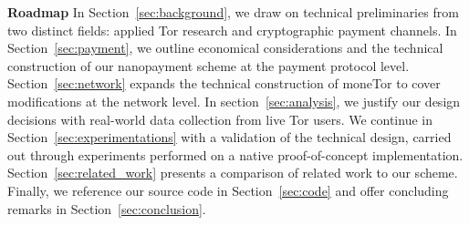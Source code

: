 \textbf{Roadmap} In Section~\ref{sec:background}, we draw on technical
preliminaries from two distinct fields: applied Tor research and cryptographic
payment channels.
In Section~\ref{sec:payment}, we outline economical considerations and the
technical construction of our nanopayment scheme at the payment protocol level.
Section~\ref{sec:network} expands the technical construction of moneTor to cover
modifications at the network level. In section~\ref{sec:analysis}, we justify
our design decisions with real-world data collection from live Tor users. We
continue in Section~\ref{sec:experimentations} with a validation of the
technical design, carried out through experiments performed on a native
proof-of-concept implementation. Section~\ref{sec:related_work} presents a
comparison of related work to our scheme. Finally, we reference our source code
in Section~\ref{sec:code} and offer concluding remarks in
Section~\ref{sec:conclusion}.


